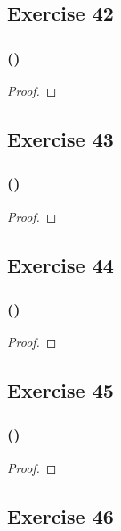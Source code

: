 \documentclass[14pt]{extarticle}
\begin{document}
\subsection{Exercise 42}

\subsubsection{()}

\begin{proof}

\end{proof}

\subsection{Exercise 43}

\subsubsection{()}

\begin{proof}

\end{proof}

\subsection{Exercise 44}

\subsubsection{()}

\begin{proof}

\end{proof}

\subsection{Exercise 45}

\subsubsection{()}

\begin{proof}

\end{proof}

\subsection{Exercise 46}
\end{document}
